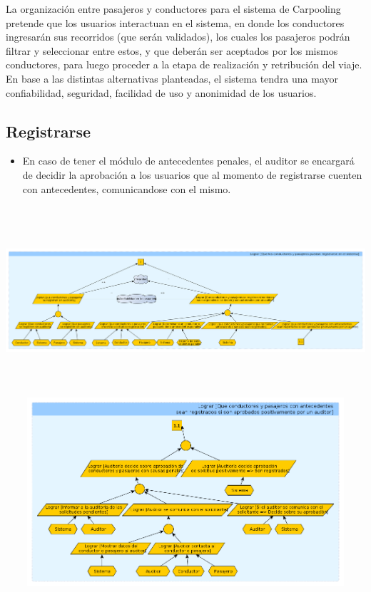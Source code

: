 \documentclass[a4paper,titlepage,10pt]{article}
\begin{document}
La organización entre pasajeros y conductores para el sistema de Carpooling pretende que los usuarios interactuan en el sistema, en donde los conductores ingresarán sus recorridos (que serán validados), los cuales los pasajeros podrán filtrar y seleccionar entre estos, y que deberán ser aceptados por los mismos conductores, para luego proceder a la etapa de realización y retribución del viaje. En base a las distintas alternativas planteadas, el sistema tendra una mayor confiabilidad, seguridad, facilidad de uso y anonimidad de los usuarios.

\subsection{Registrarse}
\begin{itemize}
\item En caso de tener el módulo de antecedentes penales, el auditor se encargará de decidir la aprobación a los usuarios que al momento de registrarse cuenten con antecedentes, comunicandose con el mismo.
\end{itemize}
\includegraphics[height=7cm,width=19.5cm]{imagenes/Registrarse.png}
\includegraphics[height=7cm,width=19.5cm]{imagenes/Registrarsea.png}
\end{document}
